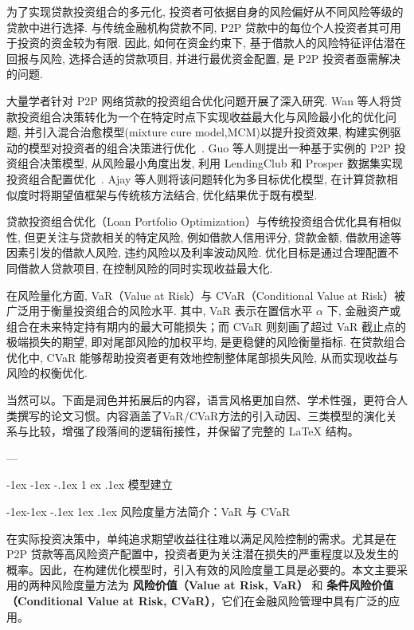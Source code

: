 \documentclass{write_paper}
\makeatletter
\renewcommand\section{\@startsection {section}{1}{\z@}%
                                   {-1ex \@plus -1ex \@minus -.1ex}%
                                   {1 ex \@plus.1ex}%
                                   {\normalfont\large\bfseries}}
\renewcommand\subsection{\@startsection{subsection}{2}{\z@}%
                                     {-1ex\@plus -1ex \@minus -.1ex}%
                                     {1ex \@plus .1ex}%
                                     {\normalfont \normalsize \bfseries}}
\makeatother
\begin{document}
为了实现贷款投资组合的多元化, 投资者可依据自身的风险偏好从不同风险等级的贷款中进行选择. 与传统金融机构贷款不同, P2P 贷款中的每位个人投资者其可用于投资的资金较为有限. 因此, 如何在资金约束下, 基于借款人的风险特征评估潜在回报与风险, 选择合适的贷款项目, 并进行最优资金配置, 是 P2P 投资者亟需解决的问题. 

大量学者针对 P2P 网络贷款的投资组合优化问题开展了深入研究. Wan 等人将贷款投资组合决策转化为一个在特定时点下实现收益最大化与风险最小化的优化问题, 并引入混合治愈模型(mixture cure model,MCM)以提升投资效果, 构建实例驱动的模型对投资者的组合决策进行优化~\cite{wan2023hybrid}. Guo 等人则提出一种基于实例的 P2P 投资组合决策模型, 从风险最小角度出发, 利用 LendingClub 和 Prosper 数据集实现投资组合配置优化~\cite{guo2016instance}. Ajay 等人则将该问题转化为多目标优化模型, 在计算贷款相似度时将期望值框架与传统核方法结合, 优化结果优于既有模型\cite{byanjankar2021data}.

贷款投资组合优化（Loan Portfolio Optimization）与传统投资组合优化具有相似性, 但更关注与贷款相关的特定风险, 例如借款人信用评分, 贷款金额, 借款用途等因素引发的借款人风险, 违约风险以及利率波动风险. 优化目标是通过合理配置不同借款人贷款项目, 在控制风险的同时实现收益最大化. 

在风险量化方面, VaR（Value at Risk）与 CVaR（Conditional Value at Risk）被广泛用于衡量投资组合的风险水平. 其中, VaR 表示在置信水平 $\alpha$ 下, 金融资产或组合在未来特定持有期内的最大可能损失；而 CVaR 则刻画了超过 VaR 截止点的极端损失的期望, 即对尾部风险的加权平均, 是更稳健的风险衡量指标. 在贷款组合优化中, CVaR 能够帮助投资者更有效地控制整体尾部损失风险, 从而实现收益与风险的权衡优化. 


当然可以。下面是润色并拓展后的内容，语言风格更加自然、学术性强，更符合人类撰写的论文习惯。内容涵盖了VaR/CVaR方法的引入动因、三类模型的演化关系与比较，增强了段落间的逻辑衔接性，并保留了完整的 LaTeX 结构。

---

\section{模型建立}

\subsection{风险度量方法简介：VaR 与 CVaR}

在实际投资决策中，单纯追求期望收益往往难以满足风险控制的需求。尤其是在 P2P 贷款等高风险资产配置中，投资者更为关注潜在损失的严重程度以及发生的概率。因此，在构建优化模型时，引入有效的风险度量工具是必要的。本文主要采用的两种风险度量方法为 \textbf{风险价值（Value at Risk, VaR）} 和 \textbf{条件风险价值（Conditional Value at Risk, CVaR）}，它们在金融风险管理中具有广泛的应用。
\end{document}
